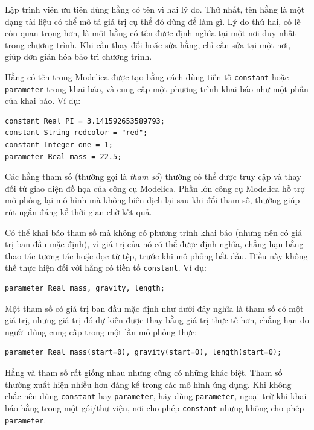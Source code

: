Lập trình viên ưu tiên dùng hằng có tên vì hai lý do. Thứ nhất, tên hằng là một dạng tài liệu có thể mô tả giá trị cụ thể đó dùng để làm gì. Lý do thứ hai, có lẽ còn quan trọng hơn, là một hằng có tên được định nghĩa tại một nơi duy nhất trong chương trình. Khi cần thay đổi hoặc sửa hằng, chỉ cần sửa tại một nơi, giúp đơn giản hóa bảo trì chương trình.

Hằng có tên trong Modelica được tạo bằng cách dùng tiền tố \texttt{constant} hoặc \texttt{parameter} trong khai báo, và cung cấp một phương trình khai báo như một phần của khai báo. Ví dụ:
\begin{verbatim}
constant Real PI = 3.141592653589793;
constant String redcolor = "red";
constant Integer one = 1;
parameter Real mass = 22.5;
\end{verbatim}
Các hằng tham số (thường gọi là \emph{tham số}) thường có thể được truy cập và thay đổi từ giao diện đồ họa của công cụ Modelica. Phần lớn công cụ Modelica hỗ trợ mô phỏng lại mô hình mà không biên dịch lại sau khi đổi tham số, thường giúp rút ngắn đáng kể thời gian chờ kết quả.

Có thể khai báo tham số mà không có phương trình khai báo (nhưng nên có giá trị ban đầu mặc định), vì giá trị của nó có thể được định nghĩa, chẳng hạn bằng thao tác tương tác hoặc đọc từ tệp, trước khi mô phỏng bắt đầu. Điều này không thể thực hiện đối với hằng có tiền tố \texttt{constant}. Ví dụ:
\begin{verbatim}
parameter Real mass, gravity, length;
\end{verbatim}
Một tham số có giá trị ban đầu mặc định như dưới đây nghĩa là tham số có một giá trị, nhưng giá trị đó dự kiến được thay bằng giá trị thực tế hơn, chẳng hạn do người dùng cung cấp trong một lần mô phỏng thực:
\begin{verbatim}
parameter Real mass(start=0), gravity(start=0), length(start=0);
\end{verbatim}
Hằng và tham số rất giống nhau nhưng cũng có những khác biệt. Tham số thường xuất hiện nhiều hơn đáng kể trong các mô hình ứng dụng. Khi không chắc nên dùng \texttt{constant} hay \texttt{parameter}, hãy dùng \texttt{parameter}, ngoại trừ khi khai báo hằng trong một gói/thư viện, nơi cho phép \texttt{constant} nhưng không cho phép \texttt{parameter}.


